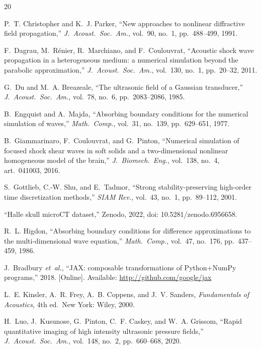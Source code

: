 \documentclass[11pt]{article}
\begin{document}
\begin{thebibliography}{20}

P.~T. Christopher and K.~J. Parker,
``New approaches to nonlinear diffractive field propagation,''
\textit{J.\ Acoust.\ Soc.\ Am.}, vol.~90, no.~1, pp.~488--499, 1991.

F.~Dagrau, M.~R\'{e}nier, R.~Marchiano, and F.~Coulouvrat,
``Acoustic shock wave propagation in a heterogeneous medium: a
numerical simulation beyond the parabolic approximation,''
\textit{J.\ Acoust.\ Soc.\ Am.}, vol.~130, no.~1, pp.~20--32, 2011.

G.~Du and M.~A. Breazeale,
``The ultrasonic field of a Gaussian transducer,''
\textit{J.\ Acoust.\ Soc.\ Am.}, vol.~78, no.~6, pp.~2083--2086, 1985.

B.~Engquist and A.~Majda,
``Absorbing boundary conditions for the numerical simulation of waves,''
\textit{Math.\ Comp.}, vol.~31, no.~139, pp.~629--651, 1977.

B.~Giammarinaro, F.~Coulouvrat, and G.~Pinton,
``Numerical simulation of focused shock shear waves in soft solids and
a two-dimensional nonlinear homogeneous model of the brain,''
\textit{J.\ Biomech.\ Eng.}, vol.~138, no.~4, art.~041003, 2016.

S.~Gottlieb, C.-W. Shu, and E.~Tadmor,
``Strong stability-preserving high-order time discretization methods,''
\textit{SIAM Rev.}, vol.~43, no.~1, pp.~89--112, 2001.

``Halle skull microCT dataset,'' Zenodo, 2022,
doi: 10.5281/zenodo.6956658.

R.~L. Higdon,
``Absorbing boundary conditions for difference approximations to the
multi-dimensional wave equation,''
\textit{Math.\ Comp.}, vol.~47, no.~176, pp.~437--459, 1986.

J.~Bradbury \textit{et~al.},
``JAX: composable transformations of Python+NumPy programs,''
2018. [Online]. Available: \url{http://github.com/google/jax}

L.~E. Kinsler, A.~R. Frey, A.~B. Coppens, and J.~V. Sanders,
\textit{Fundamentals of Acoustics}, 4th ed.\ New York: Wiley, 2000.

H.~Luo, J.~Kusunose, G.~Pinton, C.~F. Caskey, and W.~A. Grissom,
``Rapid quantitative imaging of high intensity ultrasonic pressure
fields,''
\textit{J.\ Acoust.\ Soc.\ Am.}, vol.~148, no.~2, pp.~660--668, 2020.


\end{thebibliography}
\end{document}
